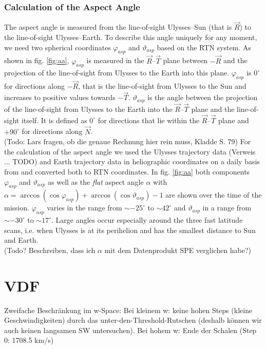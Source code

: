 \subsubsection{Calculation of the Aspect Angle}
The aspect angle is measured from the line-of-sight Ulysses--Sun (that is $\vec{R}$) to the line-of-sight Ulysses--Earth. To describe this angle uniquely for any moment, we need two spherical coordinates $\varphi_{asp}$ and $\vartheta_{asp}$ based on the RTN system. As shown in fig. \ref{fig:aa}, $\varphi_{asp}$ is measured in the $\vec{R}$--$\vec{T}$ plane between $-\vec{R}$ and the projection of the line-of-sight from Ulysses to the Earth into this plane. $\varphi_{asp}$  is $0^\circ$ for directions along $-\vec{R}$, that is the line-of-sight from Ulysses to the Sun and increases to positive values towards $-\vec{T}$. $\vartheta_{asp}$ is the angle between the projection of the line-of-sight from Ulysses to the Earth into the $\vec{R}$--$\vec{T}$ plane and the line-of-sight itself. It is defined as $0^\circ$ for directions that lie within the $\vec{R}$--$\vec{T}$ plane and $+90^\circ$ for directions along $\vec{N}$.\\
(Todo: Lars fragen, ob die genaue Rechnung hier rein muss, Kladde S. 79)
For the calculation of the aspect angle we used the Ulysses trajectory data (Verweis ... TODO) and Earth trajectory data in heliographic coordinates on a daily basis from \citet{nasa-earth-coord} and converted both to RTN coordinates. In fig. \ref{fig:aa} both components $\varphi_{asp}$ and $\vartheta_{asp}$ as well as the \textit{flat} aspect angle $\alpha$ with  $\alpha = \arccos(\cos{\varphi_{asp}}) + \arccos(\cos{\vartheta_{asp}}) -1$ are shown over the time of the mission. $\varphi_{asp}$ varies in the range from $\sim - 25^\circ$ to $\sim 42^\circ$ and $\vartheta_{asp}$ in a range from $\sim - 30^\circ$ to $\sim 17^\circ$. Large angles occur especially around the three fast latitude scans, i.e. when Ulysses is at its perihelion and has the smallest distance to Sun and Earth.\\
(Todo? Beschreiben, dass ich $\alpha$ mit dem Datenprodukt SPE verglichen habe?)

%
%
%
\section{VDF}
Zweifache Beschränkung im w-Space: Bei kleinem w: keine hohen Steps (kleine Geschwindigkeiten) durch das unter-den-Threshold-Rutschen (deshalb können wir auch keinen langsamen SW untersuchen). Bei hohem w: Ende der Schalen (Step 0: 1708.5 km/s)
%
